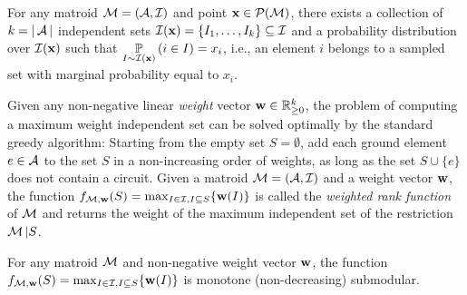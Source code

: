 \begin{lemma}\label{lem:characteristic}
For any matroid $\M=(\A, \I)$ and point $\x \in \mathcal{P}(\M)$, there exists a collection of $k = |\A|$ independent sets $\I(\x) = \{ I_1, \dots, I_k\} \subseteq \I$ and a probability distribution over $\I(\x)$ such that $\Prob{I \sim \I(\x)}{i \in I} = x_i$, i.e., an element $i$ belongs to a sampled set with marginal probability equal to $x_i$.
\end{lemma}
Given any non-negative linear {\em weight} vector $\w \in \mathbb{R}^k_{\geq 0}$, the problem of computing a maximum weight independent set can be solved optimally by the standard greedy algorithm: Starting from the empty set $S = \emptyset$, add each ground element $e \in \A$ to the set $S$ in a non-increasing order of weights, as long as the set $S \cup \{e\}$ does not contain a circuit. Given a matroid $\M=(\A,\I)$ and a weight vector $\w$, the function $f_{\M,\w}(S) = \max_{I \in \I, I \subseteq S}\{\w(I)\}$ is called the {\em weighted rank function} of $\M$ and returns the weight of the maximum independent set of the restriction $\M|S$.

\begin{lemma} \label{lem:weightedrank}
For any matroid $\M$ and non-negative weight vector $\w$, the function $f_{\M, \w}(S) = \max_{I \in \I, I \subseteq S}\{\w(I)\}$ is monotone (non-decreasing) submodular.
\end{lemma}





 